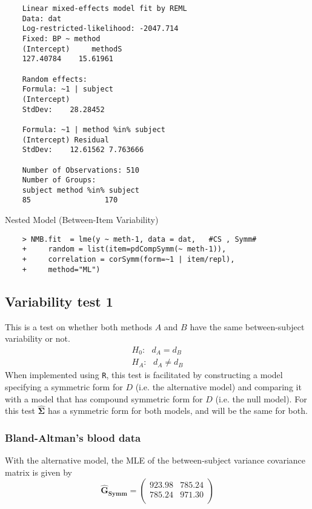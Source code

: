 \documentclass[12pt, a4paper]{report}
\theoremstyle{plain}
\theoremstyle{definition}
\theoremstyle{remark}
\begin{document}
	\begin{verbatim}
	Linear mixed-effects model fit by REML
	Data: dat
	Log-restricted-likelihood: -2047.714
	Fixed: BP ~ method
	(Intercept)     methodS
	127.40784    15.61961
	
	Random effects:
	Formula: ~1 | subject
	(Intercept)
	StdDev:    28.28452
	
	Formula: ~1 | method %in% subject
	(Intercept) Residual
	StdDev:    12.61562 7.763666
	
	Number of Observations: 510
	Number of Groups:
	subject method %in% subject
	85                 170
	\end{verbatim}
	
Nested Model (Between-Item Variability)
\begin{framed}
	\begin{verbatim}
	> NMB.fit  = lme(y ~ meth-1, data = dat,   #CS , Symm#
	+     random = list(item=pdCompSymm(~ meth-1)),
	+     correlation = corSymm(form=~1 | item/repl), 
	+     method="ML")
	\end{verbatim}
\end{framed}
	\subsection{Variability test 1}
	This is a test on whether both methods $A$ and $B$ have the same between-subject variability or not.
	\begin{eqnarray}
	H_{0}: \mbox{ }d_{A}  = d_{B} \\
	H_{A}: \mbox{ }d_{A}  \neq d_{B}
	\end{eqnarray}
	When implemented using \texttt{R}, this test is facilitated by constructing a model specifying a symmetric form for $D$ (i.e. the alternative model) and comparing it with a model that has compound symmetric form for $D$ (i.e. the null model). For this test $\boldsymbol{\hat{\Sigma}}$ has a symmetric form for both models, and will be the same for both.
	
	\subsubsection{Bland-Altman's blood data}
	With the alternative model, the MLE of the between-subject variance covariance matrix is given by
	\begin{equation}
	\boldsymbol{\hat{G}_{Symm}} = \left( \begin{array}{cc}
	923.98 & 785.24  \\
	785.24 & 971.30  \\
	\end{array}\right)
	\end{equation}
	
\end{document}
